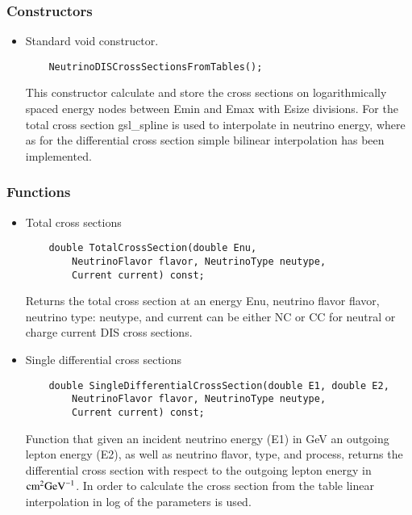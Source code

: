 \subsubsection{Constructors}

\begin{itemize}
\item Standard void constructor.
  \begin{lstlisting}
    NeutrinoDISCrossSectionsFromTables();
  \end{lstlisting}
This constructor calculate and store the cross sections on logarithmically spaced energy nodes between {\ttfamily Emin} and {\ttfamily Emax} with {\ttfamily Esize} divisions. For the total cross section {\ttfamily gsl\_spline} \citep{gough2009gnu} is used to interpolate in neutrino energy, where as for the differential cross section simple bilinear interpolation has been implemented.
\end{itemize}

\subsubsection{Functions}

\begin{itemize}
\item Total cross sections
  \begin{lstlisting}
    double TotalCrossSection(double Enu,
    	NeutrinoFlavor flavor, NeutrinoType neutype,
    	Current current) const;
  \end{lstlisting}
     Returns the total cross section at an energy {\ttf Enu}, neutrino flavor {\ttf flavor}, neutrino type: {\ttf neutype}, and
     {\ttf current} can be either {\ttf NC} or {\ttf CC} for neutral or charge current DIS cross sections.        
\item Single differential cross sections              
  \begin{lstlisting}
    double SingleDifferentialCrossSection(double E1, double E2,
    	NeutrinoFlavor flavor, NeutrinoType neutype,
    	Current current) const;
  \end{lstlisting}
      Function that given an incident neutrino energy ({\ttf E1}) in GeV an outgoing lepton energy ({\ttf E2}), as well as neutrino flavor,
       type, and process, returns the differential cross section with respect to the outgoing lepton energy in ${\rm cm}^2 {\rm GeV}^{-1}$. 
       In order to calculate the cross section from the table linear interpolation in log of the parameters is used.
\end{itemize}

